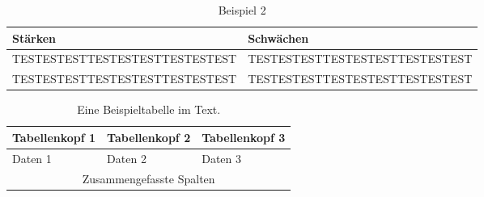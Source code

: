 \begin{table}[H]
    \centering
    \begin{tabular}{>{\centering\arraybackslash}m{}>{\centering\arraybackslash}m{}}
        \toprule
        Stärken                        & Schwächen                      \\\midrule
        TESTESTESTTESTESTESTTESTESTEST & TESTESTESTTESTESTESTTESTESTEST \\
        TESTESTESTTESTESTESTTESTESTEST & TESTESTESTTESTESTESTTESTESTEST \\\bottomrule
    \end{tabular}
    \caption{Beispiel 2}%
    \label{tab:ex2}
\end{table}

\begin{table}[h]
    \centering
    \begin{tabular}{|p{}|p{}|p{}|}
        \hline
        Tabellenkopf 1 & Tabellenkopf 2 & Tabellenkopf 3 \\\hline\hline
        Daten 1        & Daten 2        & Daten 3        \\\hline
        \multicolumn{3}{|c|}{Zusammengefasste Spalten}   \\\hline
    \end{tabular}
    \caption{Eine Beispieltabelle im Text.}
    \label{tab:ex3}
\end{table}

